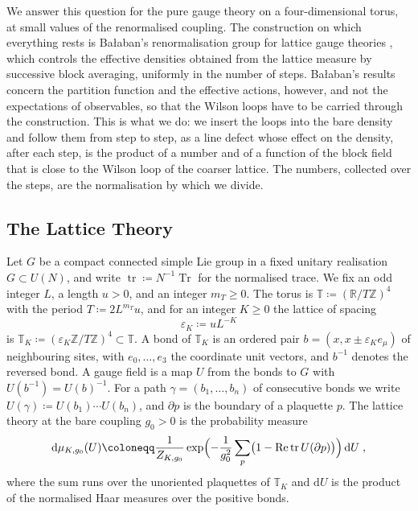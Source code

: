 \documentclass[11pt]{preprint}
\newcommand{\dd}{\mathrm{d}}
\newcommand{\tr}{\operatorname{tr}}
\numberwithin{equation}{section}
\theoremstyle{definition}
\theoremstyle{remark}
\theoremstyle{plain}
\begin{document}
We answer this question for the pure gauge theory on a four-dimensional torus, at small values of the renormalised coupling. The construction on which everything rests is Ba{\l}aban's renormalisation group for lattice gauge theories \cite{BalabanRG1,BalabanRG2,BalabanCRE,BalabanLFR1,BalabanLFR2}, which controls the effective densities obtained from the lattice measure by successive block averaging, uniformly in the number of steps. Ba{\l}aban's results concern the partition function and the effective actions, however, and not the expectations of observables, so that the Wilson loops have to be carried through the construction. This is what we do: we insert the loops into the bare density and follow them from step to step, as a line defect whose effect on the density, after each step, is the product of a number and of a function of the block field that is close to the Wilson loop of the coarser lattice. The numbers, collected over the steps, are the normalisation by which we divide.

\subsection{The Lattice Theory}\label{sec:lattice-theory}

Let $G$ be a compact connected simple Lie group in a fixed unitary realisation $G \subset U(N)$, and write $\tr \coloneqq N^{-1}\operatorname{Tr}$ for the normalised trace. We fix an odd integer $L$, a length $u > 0$, and an integer $m_T \geq 0$. The torus is $\mathbb T \coloneqq (\mathbb R/T\mathbb Z)^4$ with the period $T \coloneqq 2L^{m_T}u$, and for an integer $K \geq 0$ the lattice of spacing
\begin{equation}\label{eq:lattice-spacing}
    \varepsilon_K \coloneqq uL^{-K}
\end{equation}
is $\mathbb T_K \coloneqq (\varepsilon_K\mathbb Z/T\mathbb Z)^4 \subset \mathbb T$. A bond of $\mathbb T_K$ is an ordered pair $b = (x, x \pm \varepsilon_Ke_\mu)$ of neighbouring sites, with $e_0, \dots, e_3$ the coordinate unit vectors, and $b^{-1}$ denotes the reversed bond. A gauge field is a map $U$ from the bonds to $G$ with $U(b^{-1}) = U(b)^{-1}$. For a path $\gamma = (b_1, \dots, b_n)$ of consecutive bonds we write $U(\gamma) \coloneqq U(b_1)\cdots U(b_n)$, and $\partial p$ is the boundary of a plaquette $p$. The lattice theory at the bare coupling $g_0 > 0$ is the probability measure
\begin{equation}\label{eq:lattice-measure}
    \dd\mu_{K,g_0}(U) \coloneqq \frac{1}{Z_{K,g_0}}\exp\Bigl(-\frac{1}{g_0^2}\sum_{p}\bigl(1 - \operatorname{Re}\tr U(\partial p)\bigr)\Bigr)\,\dd U\;,
\end{equation}
where the sum runs over the unoriented plaquettes of $\mathbb T_K$ and $\dd U$ is the product of the normalised Haar measures over the positive bonds.
\end{document}
